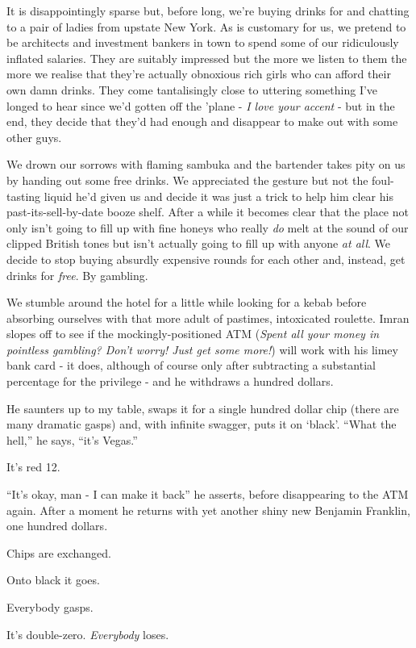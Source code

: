 \documentclass[a5paper,titlepage,draft]{book}
\begin{document}
It is disappointingly sparse but, before long, we're buying drinks for and chatting to a pair of ladies from upstate New York.  As is customary for us, we pretend to be architects and investment bankers in town to spend some of our ridiculously inflated salaries.  They are suitably impressed but the more we listen to them the more we realise that they're actually obnoxious rich girls who can afford their own damn drinks.  They come tantalisingly close to uttering something I've longed to hear since we'd gotten off the 'plane - \emph{I love your accent} - but in the end, they decide that they'd had enough and disappear to make out with some other guys.

We drown our sorrows with flaming sambuka and the bartender takes pity on us by handing out some free drinks.  We appreciated the gesture but not the foul-tasting liquid he'd given us and decide it was just a trick to help him clear his past-its-sell-by-date booze shelf.  After a while it becomes clear that the place not only isn't going to fill up with fine honeys who really \emph{do} melt at the sound of our clipped British tones but isn't actually going to fill up with anyone \emph{at all}.  We decide to stop buying absurdly expensive rounds for each other and, instead, get drinks for \emph{free}.  By gambling.

We stumble around the hotel for a little while looking for a kebab before absorbing ourselves with that more adult of pastimes, intoxicated roulette.  Imran slopes off to see if the mockingly-positioned ATM (\emph{Spent all your money in pointless gambling?  Don't worry!  Just get some more!}) will work with his limey bank card - it does, although of course only after subtracting a substantial percentage for the privilege - and he withdraws a hundred dollars.

He saunters up to my table, swaps it for a single hundred dollar chip (there are many dramatic gasps) and, with infinite swagger, puts it on `black'.  ``What the hell,'' he says, ``it's Vegas.''

It's red 12.

``It's okay, man - I can make it back'' he asserts, before disappearing to the ATM again.  After a moment he returns with yet another shiny new Benjamin Franklin, one hundred dollars.

Chips are exchanged.

Onto black it goes.

Everybody gasps.

It's double-zero.  \emph{Everybody} loses.
\end{document}
